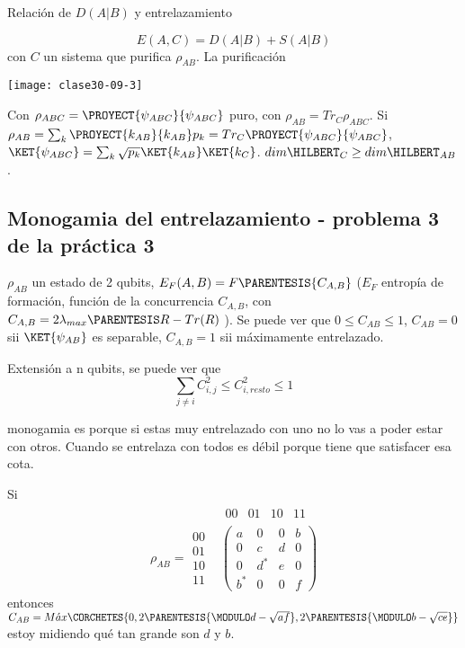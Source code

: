 Relación de $D(A|B)$ y entrelazamiento

\[
E(A,C)=D(A|B)+S(A|B)
\]
 con $C$ un sistema que purifica $\rho_{AB}$. La purificación 

\texttt{[image: clase30-09-3]}

Con $\rho_{ABC}=\PROYECT{\psi_{ABC}}{\psi_{ABC}}$ puro, con $\rho_{AB}=Tr_{C}\rho_{ABC}$.
Si $\rho_{AB}=\sum_{k}\PROYECT{k_{AB}}{k_{AB}}p_{k}=Tr_{C}\PROYECT{\psi_{ABC}}{\psi_{ABC}}$,
$\KET{\psi_{ABC}}=\sum_{k}\sqrt{p_{k}}\KET{k_{AB}}\KET{k_{C}}$. $dim\HILBERT_{C}\ge dim\HILBERT_{AB}$.

\subsection{Monogamia del entrelazamiento - problema 3 de la práctica 3}

$\rho_{AB}$ un estado de 2 qubits, $E_{F}(A,B)=F\PARENTESIS{C_{A,B}}$
($E_{F}$ entropía de formación, función de la concurrencia $C_{A,B}$,
con $C_{A,B}=2\lambda_{max}\PARENTESIS R-Tr(R)$ ). Se puede ver que
$0\leq C_{AB}\leq1$, $C_{AB}=0$ sii $\KET{\psi_{AB}}$ es separable,
$C_{A,B}=1$ sii máximamente entrelazado. 

Extensión a n qubits, se puede ver que 
\[
\sum_{j\neq i}C_{i,j}^{2}\leq C_{i,resto}^{2}\leq1
\]

monogamia es porque si estas muy entrelazado con uno no lo vas a poder
estar con otros. Cuando se entrelaza con todos es débil porque tiene
que satisfacer esa cota.

Si 
\[
\begin{array}{cc}
 & \begin{array}{cccc}
00 & 01 & 10 & 11\end{array}\\
\rho_{AB}=\begin{array}{c}
00\\
01\\
10\\
11
\end{array} & \left(\begin{array}{cccc}
a & 0 & 0 & b\\
0 & c & d & 0\\
0 & d^{*} & e & 0\\
b^{*} & 0 & 0 & f
\end{array}\right)
\end{array}
\]
entonces $C_{AB}=M\acute{a}x\CORCHETES{0,2\PARENTESIS{\MODULO d-\sqrt{af}},2\PARENTESIS{\MODULO b-\sqrt{ce}}}$estoy
midiendo qué tan grande son $d$ y $b$. 

